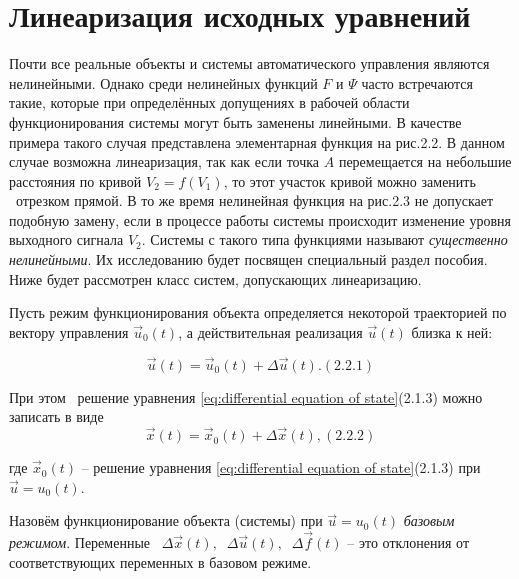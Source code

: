 \section{Линеаризация исходных уравнений}
		Почти все реальные объекты и системы автоматического управления являются нелинейными. Однако среди нелинейных функций 
		$F$ и  $\Psi$ часто встречаются такие, которые при определённых допущениях в рабочей области функционирования системы
		могут быть заменены линейными. В качестве примера такого случая представлена элементарная функция на рис.2.2. В данном
		случае возможна линеаризация, так как если точка  $A$ перемещается на небольшие расстояния по кривой  $V_2=f(V_1)$, то
		этот участок кривой можно заменить \ отрезком прямой. В то же время нелинейная функция на рис.2.3 не допускает подобную
		замену, если в процессе работы системы происходит изменение уровня выходного сигнала  $V_2$. Системы с такого типа
		функциями называют \textit{существенно нелинейными}. Их исследованию будет посвящен специальный раздел пособия. Ниже
		будет рассмотрен класс систем, допускающих линеаризацию.




\bigskip


		Пусть режим функционирования объекта определяется некоторой траекторией по вектору управления  $\vec u_0(t)$, а
		действительная реализация  $\vec u(t)$ близка к ней:


	\begin{equation}\label{key}
		 \vec u(t)=\vec u_0(t)+\Delta \vec u(t). (2.2.1)
	\end{equation}



		При этом \ решение уравнения \eqref{eq:differential equation of state}(2.1.3) можно записать в виде
\begin{equation}\label{key}
		\vec x(t)=\vec x_0(t)+\Delta \vec x(t), (2.2.2)
\end{equation}



		где  $\vec x_0(t)$ – решение уравнения  \eqref{eq:differential equation of state}(2.1.3) при  $\vec u=u_0(t)$.



		Назовём функционирование объекта (системы) при  $\vec u=u_0(t)$ \textit{базовым режимом}. Переменные \  $\Delta \vec
		x(t),\;\;\Delta \vec u(t),\;\;\Delta \vec f(t)$ – это отклонения от соответствующих переменных в базовом режиме.



